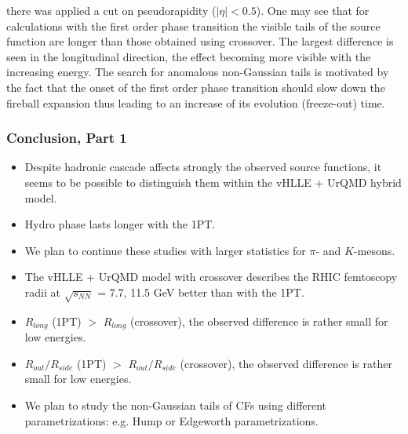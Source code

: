 \documentclass[dvipsnames] {beamer}
\begin{document}
\begin{frame}[shrink=50]
{    there was applied a cut on pseudorapidity ($|\eta| < 0.5$).
    One may see that for calculations with the first order phase
    transition the visible tails of the source function are longer than those
    obtained using crossover.
    The largest difference is seen in the longitudinal direction,
    the effect becoming more visible with the increasing energy.
    The search for anomalous non-Gaussian tails is motivated
    by the fact that the onset of the first order phase transition
    should slow down the fireball expansion thus leading to
    an increase of its evolution (freeze-out) time. 
  }
\end{frame}

\begin{frame}
  \frametitle{Conclusion, Part 1}
  \bf \centering 
  \begin{itemize}
  \item Despite hadronic cascade affects strongly the observed source functions, it seems to be possible to distinguish them within the vHLLE + UrQMD hybrid model.
  \item Hydro phase lasts longer with the 1PT.  
  \item We plan to continue these studies with larger statistics for $\pi$- and $K$-mesons.
  \item The vHLLE + UrQMD model with crossover describes the RHIC femtoscopy radii at $\sqrt{s_{NN}}$  = 7.7, 11.5 GeV
    better than with the 1PT. 
  \item $R_{long}$ (1PT) $ > $ $R_{long}$ (crossover),  the observed difference is rather small for low energies. 
  \item $R_{out} / R_{side}$ (1PT) $ > $ $R_{out} / R_{side}$ (crossover), the observed difference is rather small for low energies. 
  \item We plan to study the non-Gaussian tails of CFs using different parametrizations: e.g. Hump or Edgeworth parametrizations.
  \end{itemize}
\end{frame}

\begin{frame}
  \frametitle{}
  \bf {}
\end{frame}


\begin{frame}
  \bf {}
\end{frame}
\end{document}
